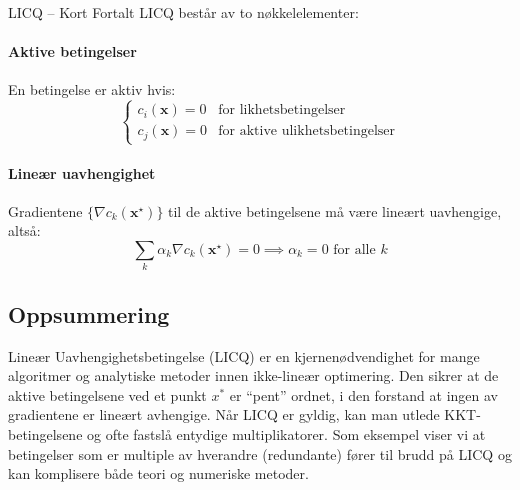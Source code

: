 \begin{remark}{LICQ -- Kort Fortalt}
	LICQ består av to nøkkelelementer:
	\paragraph{Aktive betingelser} En betingelse er aktiv hvis:
	\[ \begin{cases}
			c_i(\symbf{x}) = 0 & \text{for likhetsbetingelser}         \\
			c_j(\symbf{x}) = 0 & \text{for aktive ulikhetsbetingelser}
		\end{cases} \]
	\paragraph{Lineær uavhengighet} Gradientene \(\{\nabla c_k(\symbf{x}^\star)\}\) til de aktive betingelsene må være lineært uavhengige, altså:
	\[
		\sum_k \alpha_k \nabla c_k(\symbf{x}^\star) = 0 \implies \alpha_k = 0 \text{ for alle } k
	\]
\end{remark}

\subsection{Oppsummering}

Lineær Uavhengighetsbetingelse (LICQ) er en kjernenødvendighet for mange algoritmer og analytiske metoder innen ikke-lineær optimering. Den sikrer at de aktive betingelsene ved et punkt \(x^*\) er ``pent'' ordnet, i den forstand at ingen av gradientene er lineært avhengige. Når LICQ er gyldig, kan man utlede KKT-betingelsene og ofte fastslå entydige multiplikatorer. Som eksempel viser vi at betingelser som er multiple av hverandre (redundante) fører til brudd på LICQ og kan komplisere både teori og numeriske metoder.
